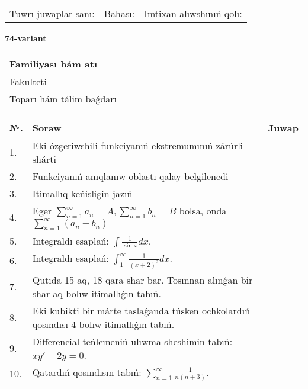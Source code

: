 \documentclass{article}
\begin{document}
\vspace{1cm}

\begin{tabular}{ c c c }
Tuwrı juwaplar sanı: \underline{\hspace{2cm}} & Bahası: \underline{\hspace{2cm}} & Imtixan alıwshınıń qolı: \underline{\hspace{2cm}} \\
\end{tabular}

\newpage

\begin{center}\textbf{74-variant}\end{center}

\bgroup
\def\arraystretch{1.5}
\begin{tabular}{ |m{6cm}|m{10cm}| }
  \hline
  Familiyası hám atı & \\
  \hline
  Fakulteti &\\
  \hline
  Toparı hám tálim baǵdarı & \\
  \hline
\end{tabular}
\egroup

\vspace{0.5cm}

\bgroup
\def\arraystretch{2}
\begin{tabular}{ |l|m{8cm}|m{7cm}| }
  \hline
  №. & Soraw & Juwap \\
  \hline
  1. & Eki ózgeriwshili funkciyanıń ekstremumınıń zárúrli shárti &  \\
  \hline
  2. & Funkciyanıń anıqlanıw oblastı qalay belgilenedi &  \\
  \hline
  3. & Itimallıq keńisligin jazıń &  \\
  \hline
  4. & Eger $\displaystyle\sum_{n = 1}^{\infty}a_{n} = A, \sum_{n = 1}^{\infty}b_{n} = B$ bolsa, onda $\displaystyle\sum_{n = 1}^{\infty}\left( a_{n} - b_{n} \right)$ &  \\
  \hline
  5. & Integraldı esaplań: $\displaystyle\int {\frac{1}{\sin x}dx} $. &  \\
  \hline
  6. & Integraldı esaplań: $\displaystyle\int_{1}^{\infty}{\frac{1}{\left( x + 2 \right)^{2}}dx }$. &  \\
  \hline
  7. & Qutıda 15 aq, 18 qara shar bar. Tosınnan alınǵan bir shar aq bolıw itimallıǵın tabıń. &  \\
  \hline
  8. & Eki kubikti bir márte taslaǵanda túsken ochkolardıń qosındısı 4 bolıw itimallıǵın tabıń. &  \\
  \hline
  9. & Differencial teńlemeniń ulıwma sheshimin tabıń: $xy' - 2y = 0$. &  \\
  \hline
  10. & Qatardıń qosındısın tabıń: $\displaystyle\sum_{n = 1}^{\infty}\frac{1}{n(n + 3)}$. &  \\
  \hline
\end{tabular}
\egroup
\end{document}
